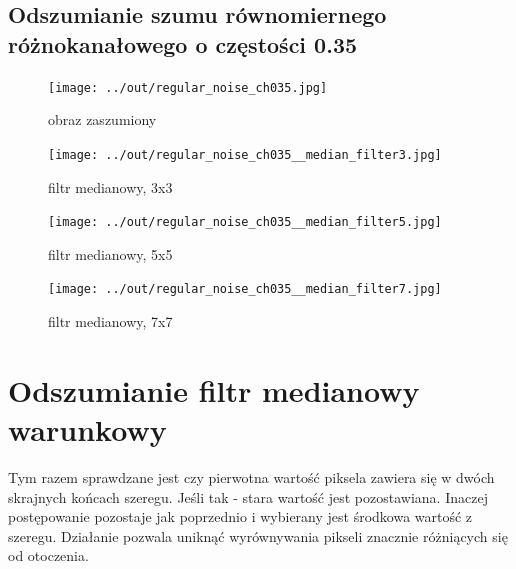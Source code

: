 \documentclass[a4paper,12pt]{article}
\begin{document}
\newpage
\subsection{Odszumianie szumu równomiernego różnokanałowego o częstości 0.35}
\begin{figure}[h!]
\begin{minipage}[t]{7.5cm}
\begin{center}
\texttt{[image: ../out/regular\_noise\_ch035.jpg]}
\caption{obraz zaszumiony}
\end{center}
\end{minipage}
\hfill
\begin{minipage}[t]{7.5cm}
\begin{center}
\texttt{[image: ../out/regular\_noise\_ch035\_\_median\_filter3.jpg]}
\caption{filtr medianowy, 3x3}
\end{center}
\end{minipage}
\end{figure}

\begin{figure}[h!]
\begin{minipage}[t]{7.5cm}
\begin{center}
\texttt{[image: ../out/regular\_noise\_ch035\_\_median\_filter5.jpg]}
\caption{filtr medianowy, 5x5}
\end{center}
\end{minipage}
\hfill
\begin{minipage}[t]{7.5cm}
\begin{center}
\texttt{[image: ../out/regular\_noise\_ch035\_\_median\_filter7.jpg]}
\caption{filtr medianowy, 7x7}
\end{center}
\end{minipage}
\end{figure}









\newpage
\section{Odszumianie filtr medianowy warunkowy}
Tym razem sprawdzane jest czy pierwotna wartość piksela zawiera się w dwóch skrajnych końcach szeregu. Jeśli tak - stara wartość jest pozostawiana. Inaczej postępowanie pozostaje jak poprzednio i wybierany jest środkowa wartość z szeregu. Działanie pozwala uniknąć wyrównywania pikseli znacznie różniących się od otoczenia.
\end{document}

